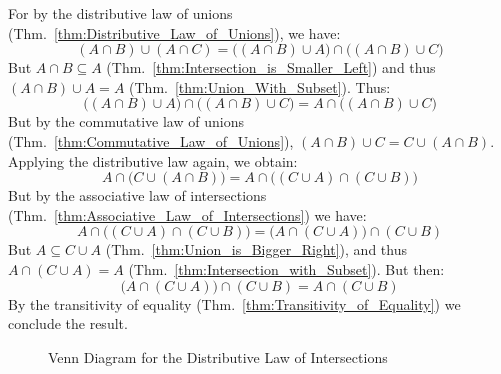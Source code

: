         \begin{bproof}
            For by the distributive law of unions
            (Thm.~\ref{thm:Distributive_Law_of_Unions}), we have:
            \begin{equation}
                    (A\cap{B})\cup(A\cap{C})
                    =\Big((A\cap{B})\cup{A}\Big)\cap\Big((A\cap{B})\cup{C}\Big)
            \end{equation}
            But $A\cap{B}\subseteq{A}$
            (Thm.~\ref{thm:Intersection_is_Smaller_Left})
            and thus $(A\cap{B})\cup{A}=A$ (Thm.~\ref{thm:Union_With_Subset}).
            Thus:
            \begin{equation}
                \Big((A\cap{B})\cup{A}\Big)\cap\Big((A\cap{B})\cup{C}\Big)
                =A\cap\Big((A\cap{B})\cup{C}\Big)
            \end{equation}
            But by the commutative law of unions
            (Thm.~\ref{thm:Commutative_Law_of_Unions}),
            $(A\cap{B})\cup{C}=C\cup(A\cap{B})$. Applying the distributive law
            again, we obtain:
            \begin{equation}
                A\cap\Big(C\cup(A\cap{B})\Big)
                =A\cap\Big((C\cup{A})\cap(C\cup{B})\Big)
            \end{equation}
            But by the associative law of intersections
            (Thm.~\ref{thm:Associative_Law_of_Intersections}) we have:
            \begin{equation}
                A\cap\Big((C\cup{A})\cap(C\cup{B})\Big)
                =\Big(A\cap(C\cup{A})\Big)\cap(C\cup{B})
            \end{equation}
            But $A\subseteq{C}\cup{A}$ (Thm.~\ref{thm:Union_is_Bigger_Right}),
            and thus $A\cap(C\cup{A})=A$
            (Thm.~\ref{thm:Intersection_with_Subset}). But then:
            \begin{equation}
                \Big(A\cap(C\cup{A})\Big)\cap(C\cup{B})
                =A\cap(C\cup{B})
            \end{equation}
            By the transitivity of equality
            (Thm.~\ref{thm:Transitivity_of_Equality}) we conclude the result.
        \end{bproof}
        \begin{figure}[H]
            \centering
            \captionsetup{type=figure}
            
            \caption{Venn Diagram for the Distributive Law of Intersections}
            \label{fig:Venn_Diagram_Distributive_Law_of_Intersections}
        \end{figure}
